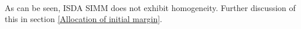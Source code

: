             
            \begin{tcolorbox}[breakable, size=fbox, boxrule=.5pt, pad at break*=1mm, opacityfill=0]
    \begin{center}
    \end{center}
    { \hspace*{\fill} \\}
\end{tcolorbox}
    

    As can be seen, ISDA SIMM does not exhibit homogeneity. Further
discussion of this in section \ref{Allocation of initial margin}.


